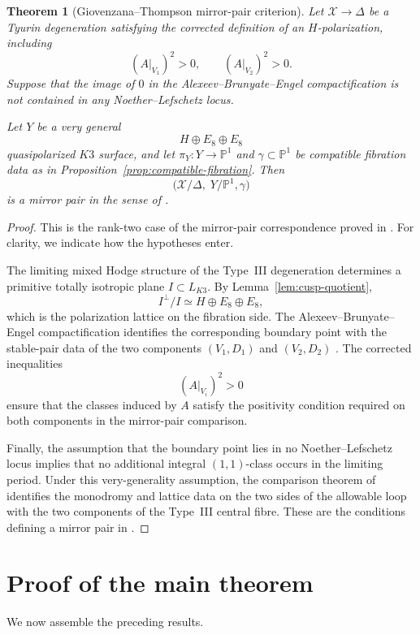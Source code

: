 \documentclass[11pt]{amsart}
\newtheorem{theorem}{Theorem}[section]
\theoremstyle{definition}
\theoremstyle{remark}
\newcommand{\cX}{\mathcal{X}}
\newcommand{\D}{\Delta}
\newcommand{\PP}{\mathbb{P}}
\begin{document}
\begin{theorem}[Giovenzana--Thompson mirror-pair criterion]
\label{thm:GT-criterion}
Let $\cX\to\D$ be a Tyurin degeneration satisfying the corrected definition
of an $H$-polarization, including
\[
(A|_{V_1})^2>0,\qquad (A|_{V_2})^2>0.
\]
Suppose that the image of $0$ in the Alexeev--Brunyate--Engel
compactification is not contained in any Noether--Lefschetz locus.

Let $Y$ be a very general
\[
H\oplus E_8\oplus E_8
\]
quasipolarized $K3$ surface, and let $\pi_Y\colon Y\to\PP^1$ and
$\gamma\subset\PP^1$ be compatible fibration data as in
Proposition~\ref{prop:compatible-fibration}.  Then
\[
\bigl(\cX/\D,\;Y/\PP^1,\gamma\bigr)
\]
is a mirror pair in the sense of \cite[Definition~5.1]{dfk3slpms}.
\end{theorem}

\begin{proof}
This is the rank-two case of the mirror-pair correspondence proved in
\cite[\S5]{dfk3slpms}.  For clarity, we indicate how the hypotheses enter.

The limiting mixed Hodge structure of the Type~III degeneration determines a
primitive totally isotropic plane $I\subset L_{K3}$.  By
Lemma~\ref{lem:cusp-quotient},
\[
I^\perp/I\simeq H\oplus E_8\oplus E_8,
\]
which is the polarization lattice on the fibration side.  The
Alexeev--Brunyate--Engel compactification identifies the corresponding
boundary point with the stable-pair data of the two components
$(V_1,D_1)$ and $(V_2,D_2)$ \cite{cmek3sspt}.  The corrected inequalities
\[
(A|_{V_i})^2>0
\]
ensure that the classes induced by $A$ satisfy the positivity condition
required on both components in the mirror-pair comparison.

Finally, the assumption that the boundary point lies in no
Noether--Lefschetz locus implies that no additional integral $(1,1)$-class
occurs in the limiting period.  Under this very-generality assumption, the
comparison theorem of \cite[\S5]{dfk3slpms} identifies the monodromy and
lattice data on the two sides of the allowable loop with the two components
of the Type~III central fibre.  These are the conditions defining a mirror
pair in \cite[Definition~5.1]{dfk3slpms}.
\end{proof}

\section{Proof of the main theorem}

We now assemble the preceding results.
\end{document}

